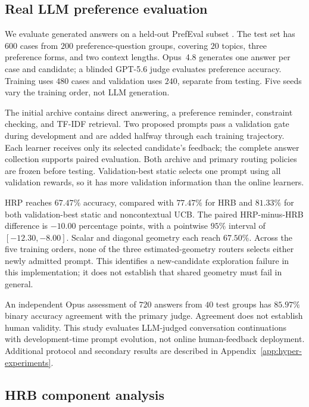 \documentclass{article} %
\begin{document}
\FloatBarrier
\subsection{Real LLM preference evaluation}
\label{sec:exp-live-llm}

We evaluate generated answers on a held-out PrefEval subset
\citep{zhao2025prefeval}. The test set has $600$ cases from $200$
preference-question groups, covering $20$ topics, three preference forms,
and two context lengths. Opus~4.8 generates one answer per case and
candidate; a blinded GPT-5.6 judge evaluates preference accuracy.
Training uses $480$ cases and validation uses $240$, separate from testing.
Five seeds vary the training order, not LLM generation.

The initial archive contains direct answering, a preference reminder,
constraint checking, and TF-IDF retrieval. Two proposed prompts pass a
validation gate during development and are added halfway through each
training trajectory. Each learner receives only its selected candidate's
feedback; the complete answer collection supports paired evaluation.
Both archive and primary routing policies are frozen before testing.
Validation-best static selects one prompt using all validation rewards,
so it has more validation information than the online learners.



HRP reaches $67.47\%$ accuracy, compared with $77.47\%$ for HRB and
$81.33\%$ for both validation-best static and noncontextual UCB.
The paired HRP-minus-HRB difference is $-10.00$ percentage points, with
a pointwise $95\%$ interval of $[-12.30,-8.00]$.
Scalar and diagonal geometry each reach $67.50\%$.
Across the five training orders, none of the three estimated-geometry
routers selects either newly admitted prompt. This identifies a
new-candidate exploration failure in this implementation; it does not
establish that shared geometry must fail in general.

An independent Opus assessment of $720$ answers from $40$ test groups has
$85.97\%$ binary accuracy agreement with the primary judge. Agreement does
not establish human validity. This study evaluates LLM-judged conversation
continuations with development-time prompt evolution, not online
human-feedback deployment. Additional protocol and secondary results are
described in Appendix~\ref{app:hyper-experiments}.

\FloatBarrier
\subsection{HRB component analysis}
\end{document}
